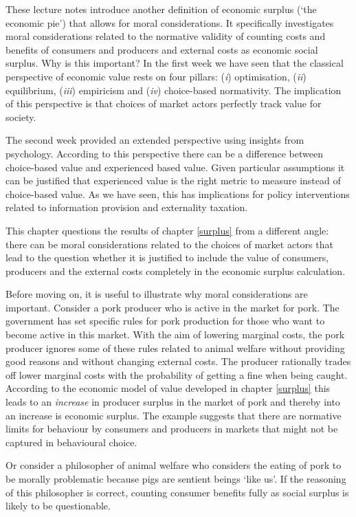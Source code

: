 \documentclass[
]{book}
\begin{document}
These lecture notes introduce another definition of economic surplus (`the economic pie') that allows for moral considerations. It specifically investigates moral considerations related to the normative validity of counting costs and benefits of consumers and producers and external costs as economic social surplus. Why is this important? In the first week we have seen that the classical perspective of economic value rests on four pillars: (\emph{i}) optimisation, (\emph{ii}) equilibrium, (\emph{iii}) empiricism and (\emph{iv}) choice-based normativity. The implication of this perspective is that choices of market actors perfectly track value for society.

The second week provided an extended perspective using insights from psychology. According to this perspective there can be a difference between choice-based value and experienced based value. Given particular assumptions it can be justified that experienced value is the right metric to measure instead of choice-based value. As we have seen, this has implications for policy interventions related to information provision and externality taxation.

This chapter questions the results of chapter \ref{surplus} from a different angle: there can be moral considerations related to the choices of market actors that lead to the question whether it is justified to include the value of consumers, producers and the external costs completely in the economic surplus calculation.

Before moving on, it is useful to illustrate why moral considerations are important. Consider a pork producer who is active in the market for pork. The government has set specific rules for pork production for those who want to become active in this market. With the aim of lowering marginal costs, the pork producer ignores some of these rules related to animal welfare without providing good reasons and without changing external costs. The producer rationally trades off lower marginal costs with the probability of getting a fine when being caught. According to the economic model of value developed in chapter \ref{surplus} this leads to an \emph{increase} in producer surplus in the market of pork and thereby into an increase is economic surplus. The example suggests that there are normative limits for behaviour by consumers and producers in markets that might not be captured in behavioural choice.

Or consider a philosopher of animal welfare who considers the eating of pork to be morally problematic because pigs are sentient beings `like us'. If the reasoning of this philosopher is correct, counting consumer benefits fully as social surplus is likely to be questionable.
\end{document}
